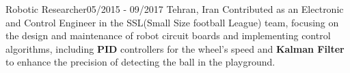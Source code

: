 \resumeSubheadingReza
{Robotic Researcher}{05/2015 - 09/2017}
{}{Tehran, Iran}
{Contributed as an Electronic and Control Engineer in the SSL(Small Size football League) team, focusing on the design and maintenance of robot circuit boards and implementing control algorithms, including \textbf{PID} controllers for the wheel's speed and \textbf{Kalman Filter} to enhance the precision of detecting the ball in the playground.}
        


